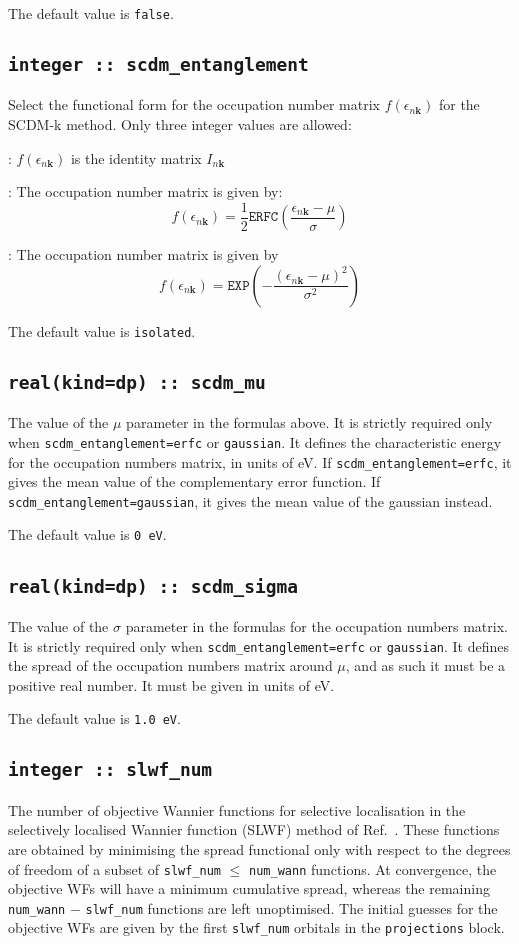 The default value is {\tt false}.

\subsection[scdm\_entanglement]{\tt integer :: scdm\_entanglement}
Select the functional form for the occupation number matrix $f(\epsilon_{n\mathbf{k}})$ for the SCDM-k method.
Only three integer values are allowed:

: $f(\epsilon_{n\mathbf{k}})$ is the identity matrix $I_{n\mathbf{k}}$

: The occupation number matrix is given by: $$f(\epsilon_{n\mathbf{k}})=\frac{1}{2}\mathtt{ERFC}\left(\frac{\epsilon_{n\mathbf{k}} - \mu}{\sigma}\right) $$

: The occupation number matrix is given by $$f(\epsilon_{n\mathbf{k}})=\mathtt{EXP}\left(-\frac{(\epsilon_{n\mathbf{k}}-\mu)^2}{\sigma^2}\right)$$

The default value is {\tt isolated}.

\subsection[scdm\_mu]{\tt real(kind=dp) :: scdm\_mu}
The value of the $\mu$ parameter in the formulas above. It is strictly required only when {\tt scdm\_entanglement=erfc} or {\tt gaussian}. It defines the characteristic energy for the occupation numbers matrix, in units of eV. If {\tt scdm\_entanglement=erfc}, it gives the mean value of the complementary error function. If {\tt scdm\_entanglement=gaussian}, it gives the mean value of the gaussian instead.

The default value is {\tt 0 eV}.

\subsection[scdm\_sigma]{\tt real(kind=dp) :: scdm\_sigma}
The value of the $\sigma$ parameter in the formulas for the occupation numbers matrix. It is strictly required only when {\tt scdm\_entanglement=erfc} or {\tt gaussian}. It defines the spread of the occupation numbers matrix around $\mu$, and as such it must be a positive real number. It must be given in units of eV.

The default value is {\tt 1.0 eV}.

\subsection[slwf\_num]{\tt integer :: slwf\_num}
The number of objective Wannier functions for selective localisation in the selectively localised Wannier function (SLWF) method of Ref.~\cite{Marianetti}. These functions are obtained by minimising the spread functional only with respect to the degrees of freedom of a subset of {\tt slwf\_num} $\le$ {\tt num\_wann} functions. At convergence, the objective WFs will have a minimum cumulative spread, whereas the remaining {\tt num\_wann} $-$ {\tt slwf\_num} functions are left unoptimised. The initial guesses for the objective WFs are given by the first {\tt slwf\_num} orbitals in the {\tt projections} block. 

